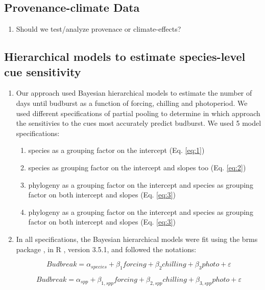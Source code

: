 \documentclass{article}\usepackage[]{graphicx}\usepackage[]{color}
\begin{document}
\subsection*{Provenance-climate Data}
\begin{enumerate}
\item Should we test/analyze provenace or climate-effects? 
\end{enumerate}

\subsection*{Hierarchical models to estimate species-level cue sensitivity}
\begin{enumerate}
\item Our approach used Bayesian hierarchical models to estimate the number of days until budburst as a function of forcing, chilling and photoperiod. We used different specifications of partial pooling to determine in which approach the sensitivies to the cues most accurately predict budburst. We used 5 model specifications: 
\begin{enumerate}
\item species as a grouping factor on the intercept (Eq. \ref{eq:1})
\item species as grouping factor on the intercept and slopes too (Eq. \ref{eq:2})
\item phylogeny as a grouping factor on the intercept and species as grouping factor on both  intercept and slopes (Eq. \ref{eq:3})
\item phylogeny as a grouping factor on the intercept and species as grouping factor on both  intercept and slopes (Eq. \ref{eq:3})

\end{enumerate}

\item In all specifications, the Bayesian hierarchical models were fit using the brms package \citep{brms}, in R \citep{R}, version 3.5.1, and followed the notations: 


\begin{equation}
\label{eq:1} 
Budbreak = \alpha_{species} + \beta_{1}forcing 
+ \beta_{2}chilling + \beta_{3}photo + \varepsilon
\end{equation}


\begin{equation} 
\label{eq:2} 
Budbreak = \alpha_{spp} + \beta_{1,spp}forcing
+ \beta_{2,spp}chilling + \beta_{3,spp}photo + \varepsilon\end{equation}


\end{enumerate}
\end{document}
